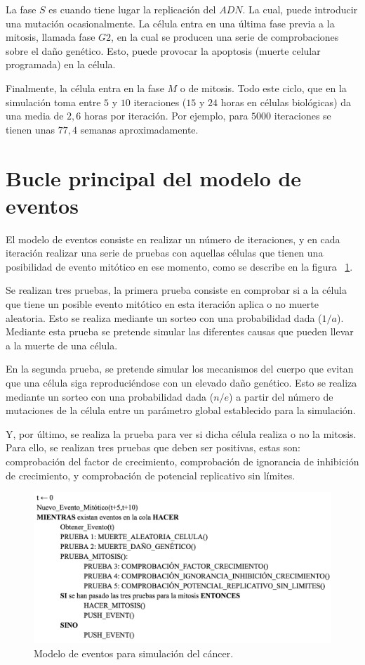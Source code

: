 La fase $S$ es cuando tiene lugar la replicación del $ADN$. La cual, puede introducir una mutación ocasionalmente.
La célula entra en una última fase previa a la mitosis, llamada fase $G2$, en la cual se producen una serie
de comprobaciones sobre el daño genético. Esto, puede provocar la apoptosis (muerte celular programada) en la célula.

Finalmente, la célula entra en la fase $M$ o de mitosis. Todo este ciclo, que en la simulación toma entre $5$ y $10$ iteraciones
($15$ y $24$ horas en células biológicas) da una media de $2,6$ horas por iteración. Por ejemplo, para $5000$ iteraciones se tienen
unas $77,4$ semanas aproximadamente.

\section{Bucle principal del modelo de eventos}

El modelo de eventos consiste en realizar un número de iteraciones, y en cada iteración realizar
una serie de pruebas con aquellas células que tienen una posibilidad de evento mitótico en ese
momento, como se describe en la figura ~\ref{fig:eventmodel}.

Se realizan tres pruebas, la primera prueba consiste en comprobar si a la célula que tiene
un posible evento mitótico en esta iteración aplica o no muerte aleatoria. Esto se realiza mediante un
sorteo con una probabilidad dada ($1/a$). Mediante esta prueba se pretende simular las diferentes
causas que pueden llevar a la muerte de una célula.

En la segunda prueba, se pretende simular los mecanismos del cuerpo que evitan que una célula
siga reproduciéndose con un elevado daño genético. Esto se realiza mediante un sorteo con una probabilidad
dada ($n/e$) a partir del número de mutaciones de la célula entre un parámetro global establecido para
la simulación.

Y, por último, se realiza la prueba para ver si dicha célula realiza o no la mitosis.
Para ello, se realizan tres pruebas que deben ser positivas, estas son: comprobación del factor de crecimiento,
comprobación de ignorancia de inhibición de crecimiento, y comprobación de potencial replicativo sin límites.

\begin{figure}[h]
\centering
\includegraphics[scale=0.8]{figures/pseudo_alg}
\caption{Modelo de eventos para simulación del cáncer.}
\label{fig:eventmodel}
\end{figure}

